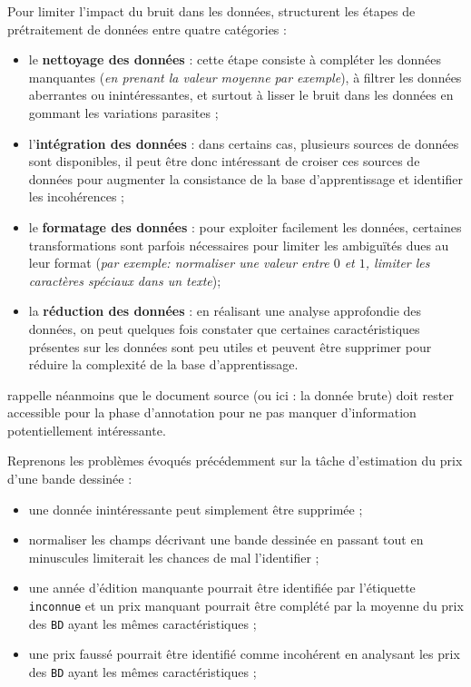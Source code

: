 			Pour limiter l'impact du bruit dans les données, \cite{alasadi-bhaya:2017:review-data-preprocessing} structurent les étapes de prétraitement de données entre quatre catégories :
			\begin{itemize}
				\item le \textbf{nettoyage des données} : cette étape consiste à compléter les données manquantes (\textit{en prenant la valeur moyenne par exemple}), à filtrer les données aberrantes ou inintéressantes, et surtout à lisser le bruit dans les données en gommant les variations parasites ;
				\item l'\textbf{intégration des données} : dans certains cas, plusieurs sources de données sont disponibles, il peut être donc intéressant de croiser ces sources de données pour augmenter la consistance de la base d'apprentissage et identifier les incohérences ;
				\item le \textbf{formatage des données} : pour exploiter facilement les données, certaines transformations sont parfois nécessaires pour limiter les ambiguïtés dues au leur format (\textit{par exemple: normaliser une valeur entre $0$ et $1$, limiter les caractères spéciaux dans un texte});
				\item la \textbf{réduction des données} : en réalisant une analyse approfondie des données, on peut quelques fois constater que certaines caractéristiques présentes sur les données sont peu utiles et peuvent être supprimer pour réduire la complexité de la base d'apprentissage.
			\end{itemize}
			\cite{baledent:2022:complexite-annotation-manuelle} rappelle néanmoins que le document source (ou ici : la donnée brute) doit rester accessible pour la phase d'annotation pour ne pas manquer d'information potentiellement intéressante.
			\begin{leftBarExamples}
				Reprenons les problèmes évoqués précédemment sur la tâche d'estimation du prix d'une bande dessinée :
				\begin{itemize}
					\item une donnée inintéressante peut simplement être supprimée ;
					\item normaliser les champs décrivant une bande dessinée en passant tout en minuscules limiterait les chances de mal l'identifier ;
					\item une année d'édition manquante pourrait être identifiée par l'étiquette \texttt{inconnue} et un prix manquant pourrait être complété par la moyenne du prix des \texttt{BD} ayant les mêmes caractéristiques ;
					\item une prix faussé pourrait être identifié comme incohérent en analysant les prix des \texttt{BD} ayant les mêmes caractéristiques ;
				\end{itemize}
			\end{leftBarExamples}
		
